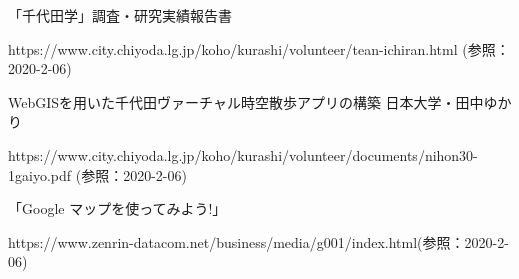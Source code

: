\documentclass[a4paper, twoside]{jarticle}
\begin{document}
\begin{thebibliography}{99}
「千代田学」調査・研究実績報告書\par
https://www.city.chiyoda.lg.jp/koho/kurashi/volunteer/tean-ichiran.html (参照：2020-2-06)

 WebGISを用いた千代田ヴァーチャル時空散歩アプリの構築 日本大学・田中ゆかり\par
https://www.city.chiyoda.lg.jp/koho/kurashi/volunteer/documents/nihon30-1gaiyo.pdf (参照：2020-2-06)

 「Google マップを使ってみよう!」\par
https://www.zenrin-datacom.net/business/media/g001/index.html(参照：2020-2-06)



\end{thebibliography}
\end{document}

